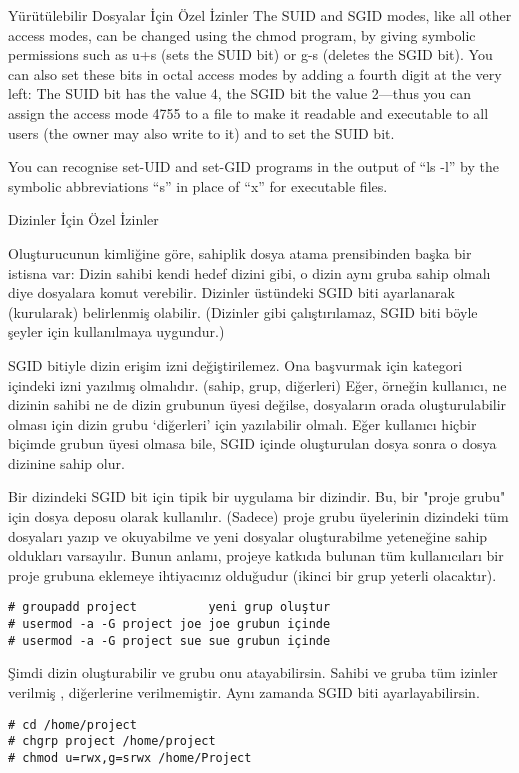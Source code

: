 \begin{section}{Yürütülebilir Dosyalar İçin Özel İzinler}
The SUID and SGID modes, like all other access modes, can be changed using the chmod program, by giving symbolic permissions such as u+s (sets the SUID bit) or g-s (deletes the SGID bit). You can also set these bits in octal access modes by adding a fourth digit at the very left: The SUID bit has the value 4, the SGID bit the value 2—thus you can assign the access mode 4755 to a file to make it readable and executable to all users (the owner may also write to it) and to set the SUID bit.

You can recognise set-UID and set-GID programs in the output of “ls -l” by the symbolic abbreviations “s” in place of “x” for executable files.
\end{section}
\begin{section}{Dizinler İçin Özel İzinler}

Oluşturucunun kimliğine göre, sahiplik dosya atama prensibinden başka bir istisna var: Dizin sahibi kendi hedef dizini gibi, o dizin aynı gruba sahip olmalı diye dosyalara komut verebilir. Dizinler üstündeki SGID biti ayarlanarak (kurularak) belirlenmiş olabilir. (Dizinler gibi çalıştırılamaz, SGID biti böyle şeyler için kullanılmaya uygundur.)

SGID bitiyle dizin erişim izni değiştirilemez. Ona başvurmak için kategori içindeki izni yazılmış olmalıdır. (sahip, grup, diğerleri) Eğer, örneğin kullanıcı, ne dizinin sahibi ne de dizin grubunun üyesi değilse, dosyaların orada oluşturulabilir olması için dizin grubu ‘diğerleri’ için yazılabilir olmalı. Eğer kullanıcı hiçbir biçimde grubun üyesi olmasa bile, SGID içinde oluşturulan dosya sonra o dosya dizinine sahip olur.

Bir dizindeki SGID bit için tipik bir uygulama bir dizindir. Bu, bir "proje grubu" için dosya deposu olarak kullanılır. (Sadece) proje grubu üyelerinin dizindeki tüm dosyaları yazıp ve okuyabilme ve yeni dosyalar oluşturabilme yeteneğine sahip oldukları varsayılır. Bunun anlamı, projeye katkıda bulunan tüm kullanıcıları bir proje grubuna eklemeye ihtiyacınız olduğudur (ikinci bir grup yeterli olacaktır).
\begin{verbatim}
# groupadd project          yeni grup oluştur
# usermod -a -G project joe joe grubun içinde
# usermod -a -G project sue sue grubun içinde
\end{verbatim}

Şimdi dizin oluşturabilir ve grubu onu atayabilirsin. Sahibi ve gruba tüm izinler verilmiş , diğerlerine verilmemiştir. Aynı zamanda SGID biti ayarlayabilirsin.
\begin{verbatim}
# cd /home/project
# chgrp project /home/project
# chmod u=rwx,g=srwx /home/Project
\end{verbatim}


\end{section}

